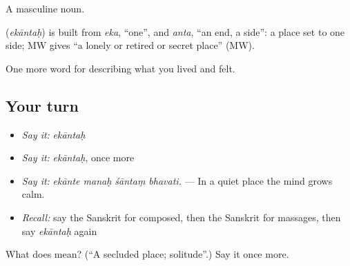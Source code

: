 A masculine noun.

\begin{cousinweb}
\textbf{} (\emph{ekāntaḥ}) is built from \emph{eka}, \textquotedblleft{}one\textquotedblright{}, and \emph{anta}, \textquotedblleft{}an end, a side\textquotedblright{}: a place set to one side; MW gives \textquotedblleft{}a lonely or retired or secret place\textquotedblright{} (MW).
\end{cousinweb}

\begin{grammarlens}[title={What you've built}]
One more word for describing what you lived and felt.
\end{grammarlens}

\subsection*{Your turn}
\begin{itemize}
\raggedright
  \item \emph{Say it:} \emph{ekāntaḥ}
  \item \emph{Say it:} \emph{ekāntaḥ}, once more
  \item \emph{Say it:} \emph{ekānte manaḥ śāntaṃ bhavati.} — In a quiet place the mind grows calm.
  \item \emph{Recall:} say the Sanskrit for composed, then the Sanskrit for massages, then say \emph{ekāntaḥ} again
\end{itemize}

\begin{tcolorbox}[breakable,colback=teal!4,colframe=teal!35!black,title={Before you move on}]
What does  mean? (\textquotedblleft{}A secluded place; solitude\textquotedblright{}.) Say it once more.
\end{tcolorbox}
